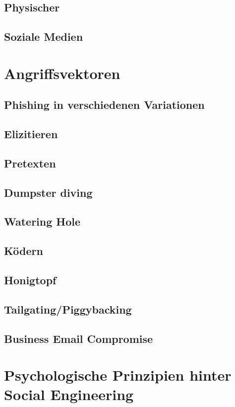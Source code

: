 \subsection{Physischer}
\subsection{Soziale Medien}

\section{Angriffsvektoren}

\subsection{Phishing in verschiedenen Variationen}
\subsection{Elizitieren}
\subsection{Pretexten}
\subsection{Dumpster diving}
\subsection{Watering Hole}
\subsection{Ködern}
\subsection{Honigtopf}
\subsection{Tailgating/Piggybacking}
\subsection{Business Email Compromise}

\section{Psychologische Prinzipien hinter Social Engineering}

